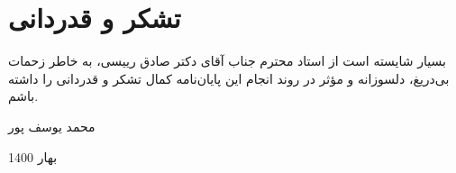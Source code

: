 \pagestyle{empty}
\section*{\Nastaliq
تشکر و قدردانی \\
}
بسيار شايسته است از استاد محترم جناب آقای دکتر صادق رییسی، به خاطر زحمات بی‌دریغ، دلسوزانه و مؤثر در روند انجام اين پايان‌نامه کمال تشکر و قدردانی را داشته باشم.  
\begin{flushleft}
\Nastaliq
محمد یوسف پور

بهار 1400 
\end{flushleft}
\restoregeometry

\newpage\null\newpage
\normalsize
